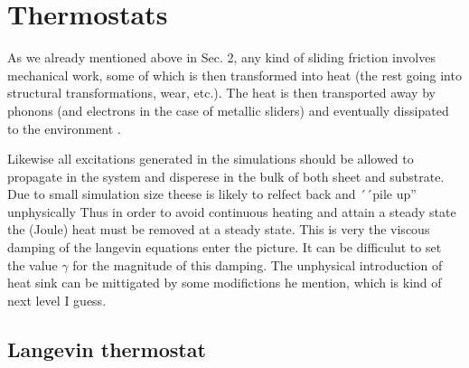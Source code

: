 

\section{Thermostats}

As we already mentioned above in Sec. 2, any kind of sliding friction involves mechanical work, some of which is then transformed into heat (the rest going into structural transformations, wear, etc.). The heat is then transported away by phonons (and electrons in the case of metallic sliders) and eventually dissipated to the environment \cite{Manini_2016}.



Likewise all excitations generated in the simulations should be allowed to propagate in the system and disperese in the bulk of both sheet and substrate. Due to small simulation size theese is likely to relfect back and ´´pile up'' unphysically Thus in order to avoid continuous heating and attain a steady state the (Joule) heat must be removed at a steady state. This is very the viscous damping of the langevin equations enter the picture. It can be difficulut to set the value $\gamma$ for the magnitude of this damping. The unphysical introduction of heat sink can be mittigated by some modifictions he mention, which is kind of next level I guess. 


\subsection{Langevin thermostat} \label{sec:langevin}


